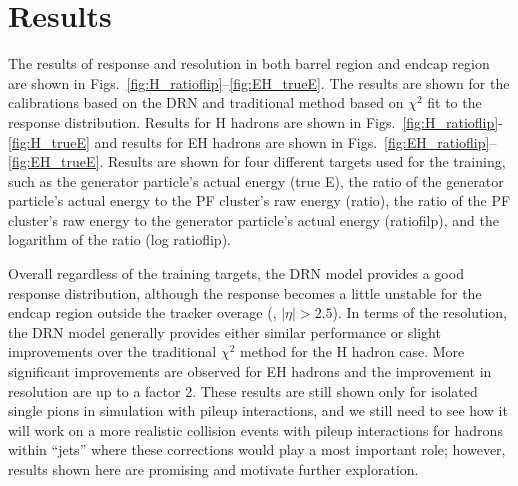 \section{Results}
The results of response and resolution in both barrel region and endcap region are shown in Figs.~\ref{fig:H_ratioflip}--\ref{fig:EH_trueE}.
The results are shown for the calibrations based on the DRN and traditional method based on $\chi^2$ fit to the response distribution.
Results for H hadrons are shown in Figs.~\ref{fig:H_ratioflip}-\ref{fig:H_trueE} and results for EH hadrons are shown in Figs.~\ref{fig:EH_ratioflip}--\ref{fig:EH_trueE}.
Results are shown for four different targets used for the training, such as the generator particle's actual energy (true E), the ratio of the generator particle's actual energy to the PF cluster's raw energy (ratio), the ratio of the PF cluster's raw energy to the generator particle's actual energy (ratiofilp), and the logarithm of the ratio (log ratioflip). 

Overall regardless of the training targets, the DRN model provides a good response distribution, although the response becomes a little unstable for the endcap region outside the tracker overage (\ie, $|\eta|>2.5$).
In terms of the resolution, the DRN model generally provides either similar performance or slight improvements over the traditional $\chi^2$ method for the H hadron case.
More significant improvements are observed for EH hadrons and the improvement in resolution are up to a factor 2.
These results are still shown only for isolated single pions in simulation with pileup interactions, and we still need to see how it will work on a more realistic collision events with pileup interactions for hadrons within ``jets'' where these corrections would play a most important role; however, results shown here are promising and motivate further exploration.













